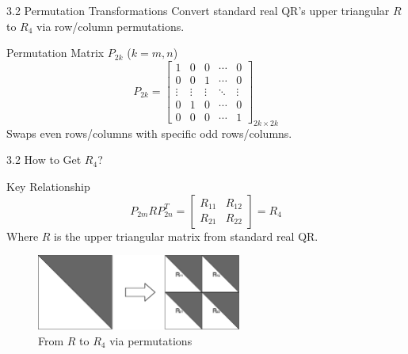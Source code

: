 \documentclass{beamer}
\begin{document}
\begin{frame}{3.2 Permutation Transformations}
  Convert standard real QR's upper triangular $R$ to $R_4$ via row/column permutations.
  
  \begin{block}{Permutation Matrix $P_{2k}$ ($k=m,n$)}
    \[
    P_{2k} = \begin{bmatrix}
    1 & 0 & 0 & \cdots & 0 \\
    0 & 0 & 1 & \cdots & 0 \\
    \vdots & \vdots & \vdots & \ddots & \vdots \\
    0 & 1 & 0 & \cdots & 0 \\
    0 & 0 & 0 & \cdots & 1
    \end{bmatrix}_{2k \times 2k}
    \]
    Swaps even rows/columns with specific odd rows/columns.
  \end{block}
  \end{frame}

  \begin{frame}{3.2 How to Get $R_4$?}
  \begin{block}{Key Relationship}
    \[
    P_{2m} R P_{2n}^T = \begin{bmatrix} R_{11} & R_{12} \\ R_{21} & R_{22} \end{bmatrix} = R_4
    \]
    Where $R$ is the upper triangular matrix from standard real QR.
  \end{block}
  
  \begin{figure}[h]
    \centering
    \includegraphics[width=0.6\textwidth]{images/Figure_1.png} %
    \caption{From $R$ to $R_4$ via permutations}
  \end{figure}
\end{frame}
\end{document}

